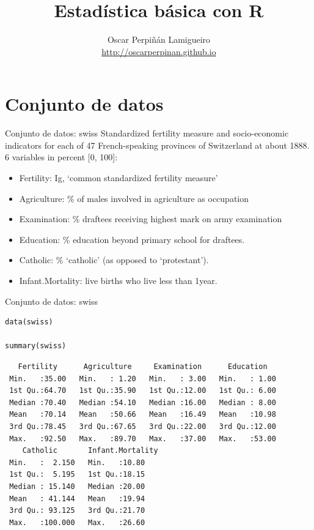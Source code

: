 \documentclass[xcolor={usenames,svgnames,dvipsnames}]{beamer}
\author{Oscar Perpiñán Lamigueiro \\ \url{http://oscarperpinan.github.io}}
\date{}
\title{Estadística básica con R}
\begin{document}
\maketitle

\section{Conjunto de datos}
\label{sec-1}

\begin{frame}[label=sec-1-1]{Conjunto de datos: swiss}
Standardized fertility measure and socio-economic indicators for
each of 47 French-speaking provinces of Switzerland at
about 1888. 6 variables in percent [0, 100]:

\begin{itemize}
\item \alert{Fertility}:         Ig, ‘common standardized fertility measure’
\item \alert{Agriculture}:       \% of males involved in agriculture as occupation
\item \alert{Examination}:       \% draftees receiving highest mark on army examination
\item \alert{Education}:         \% education beyond primary school for draftees.
\item \alert{Catholic}:          \% ‘catholic’ (as opposed to ‘protestant’).
\item \alert{Infant.Mortality}:  live births who live less than 1year.
\end{itemize}
\end{frame}

\begin{frame}[fragile,label=sec-1-2]{Conjunto de datos: swiss}
 \lstset{language=R,label= ,caption= ,numbers=none}
\begin{lstlisting}
data(swiss)

summary(swiss)
\end{lstlisting}

\begin{verbatim}
   Fertility      Agriculture     Examination      Education    
 Min.   :35.00   Min.   : 1.20   Min.   : 3.00   Min.   : 1.00  
 1st Qu.:64.70   1st Qu.:35.90   1st Qu.:12.00   1st Qu.: 6.00  
 Median :70.40   Median :54.10   Median :16.00   Median : 8.00  
 Mean   :70.14   Mean   :50.66   Mean   :16.49   Mean   :10.98  
 3rd Qu.:78.45   3rd Qu.:67.65   3rd Qu.:22.00   3rd Qu.:12.00  
 Max.   :92.50   Max.   :89.70   Max.   :37.00   Max.   :53.00  
    Catholic       Infant.Mortality
 Min.   :  2.150   Min.   :10.80   
 1st Qu.:  5.195   1st Qu.:18.15   
 Median : 15.140   Median :20.00   
 Mean   : 41.144   Mean   :19.94   
 3rd Qu.: 93.125   3rd Qu.:21.70   
 Max.   :100.000   Max.   :26.60
\end{verbatim}
\end{frame}
\end{document}

